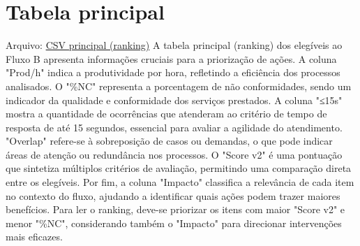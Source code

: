 \documentclass[11pt]{article}
\begin{document}
\section{Tabela principal}
\label{sec:orgf2a69cc}
Arquivo: \href{file:///home/gustavodetarso/Documentos/atestmed-defender/graphs\_and\_tables/exports/relatorio\_fluxo\_b\_2025-01-01\_a\_2025-06-30.csv}{CSV principal (ranking)}
A tabela principal (ranking) dos elegíveis ao Fluxo B apresenta informações cruciais para a priorização de ações. A coluna "Prod/h" indica a produtividade por hora, refletindo a eficiência dos processos analisados. O "\%NC" representa a porcentagem de não conformidades, sendo um indicador da qualidade e conformidade dos serviços prestados. A coluna "≤15s" mostra a quantidade de ocorrências que atenderam ao critério de tempo de resposta de até 15 segundos, essencial para avaliar a agilidade do atendimento. "Overlap" refere-se à sobreposição de casos ou demandas, o que pode indicar áreas de atenção ou redundância nos processos. O "Score v2" é uma pontuação que sintetiza múltiplos critérios de avaliação, permitindo uma comparação direta entre os elegíveis. Por fim, a coluna "Impacto" classifica a relevância de cada item no contexto do fluxo, ajudando a identificar quais ações podem trazer maiores benefícios. Para ler o ranking, deve-se priorizar os itens com maior "Score v2" e menor "\%NC", considerando também o "Impacto" para direcionar intervenções mais eficazes.
\end{document}
